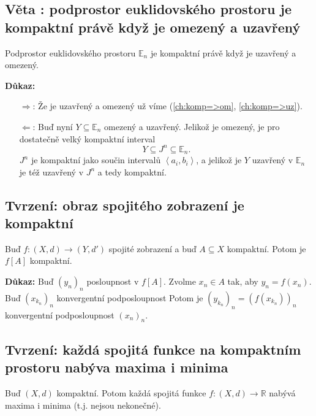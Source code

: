 \documentclass[../main.tex]{subfiles}
\begin{document}
\newpage
\subsection{Věta : podprostor euklidovského prostoru je kompaktní právě když je omezený a uzavřený}
\hspace{1.2mm}
\noindent
Podprostor euklidovského prostoru $\mathbb{E}_n$ je kompaktní právě když je uzavřený a omezený.

\vspace{5mm}
\noindent
\textbf{Důkaz:} 
\begin{enumerate}
	\item[$\Rightarrow$:] Že je uzavřený a omezený už víme (\ref{ch:komp=>om}, \ref{ch:komp=>uz}).
	\item[$\Leftarrow$:] Buď nyní $Y \subseteq \mathbb{E}_n$ omezený a uzavřený. Jelikož je omezený, je pro dostatečně velký kompaktní interval
    \[Y \subseteq J^n \subseteq \mathbb{E}_n.\]
    $J^n$ je kompaktní jako součin intervalů $\left<a_i,b_i\right>$, a jelikož je $Y$ uzavřený v $\mathbb{E}_n$ je též uzavřený
    v $J^n$ a tedy kompaktní.
\end{enumerate}

\subsection{Tvrzení: obraz spojitého zobrazení je kompaktní}
\hspace{1.2mm}
\noindent
Buď $f: (X,d) \to (Y, d')$ spojité zobrazení a buď $A \subseteq X$ kompaktní. Potom je $f[A]$ kompaktní.


\vspace{5mm}
\noindent
\textbf{Důkaz:} Buď $(y_n)_n$ posloupnost v $f[A]$. Zvolme $x_n \in A$ tak, aby $y_n = f(x_n)$. Buď $(x_{k_n})_n$ konvergentní podposloupnost
Potom je $(y_{k_n})_n = (f(x_{k_n}))_n$ konvergentní podposloupnost $(x_n)_n$.

\subsection{Tvrzení: každá spojitá funkce na kompaktním prostoru nabýva maxima i minima}
\hspace{1.2mm}
\noindent
Buď $(X,d)$ kompaktní. Potom každá spojitá funkce $f:(X,d)\to \mathbb{R}$ nabývá maxima i minima (t.j. nejsou nekonečné).
\end{document}
